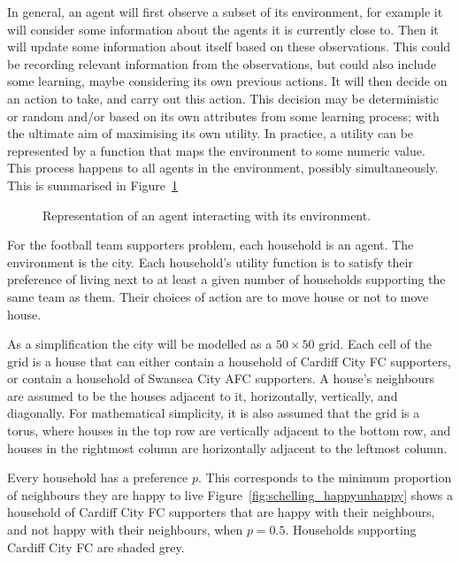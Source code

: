 In general, an agent will first observe a subset of its environment, for
example it will consider some information about the agents it is currently
close to.
Then it will update some information about itself based on these observations.
This could be recording relevant information from the observations, but could
also include some learning, maybe considering its own previous
actions.
It will then decide on an action to take, and carry out this action. This
decision may be deterministic or random and/or based on its own
attributes from some learning process; with the ultimate aim of
maximising its own utility. In practice, a utility can be represented by a
function that maps the environment to some numeric value.
This process happens to all agents in the environment, possibly simultaneously.
This is summarised in Figure~\ref{fig:abm_diagram}

\begin{figure}
    \begin{center}
        
    \end{center}
    \caption{Representation of an agent interacting with its environment.}
    \label{fig:abm_diagram}
\end{figure}

For the football team supporters problem, each household is an agent.
The environment is the city.
Each household's utility function is to satisfy their preference of living next
to at least a given number of households supporting the same team as them.
Their choices of action are to move house or not to move house.

As a simplification the city will be modelled as a \(50 \times 50\) grid.
Each cell of the grid is a house that can either contain a household of Cardiff
City FC supporters, or contain a household of Swansea City AFC supporters.
A house's neighbours are assumed to be the houses adjacent to it, horizontally,
vertically, and diagonally.
For mathematical simplicity, it is also assumed that the grid is a torus,
where
houses in the top row are vertically adjacent to the bottom row, and houses in
the rightmost column are horizontally adjacent to the leftmost column.

Every household has a preference \(p\).
This corresponds to the minimum proportion of neighbours they are happy to live
Figure~\ref{fig:schelling_happyunhappy} shows a household of Cardiff City FC
supporters that are happy with their neighbours, and not happy with their
neighbours, when \(p=0.5\). Households supporting Cardiff City FC are shaded
grey.

